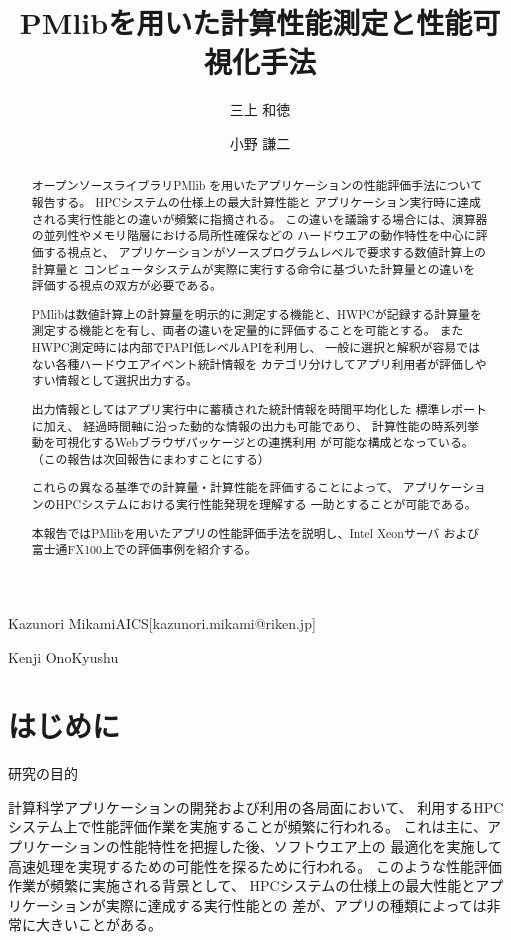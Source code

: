\documentclass[submit,techrep,noauthor]{ipsj}
\begin{document}
\title{PMlibを用いた計算性能測定と性能可視化手法}


\author{三上 和徳}{Kazunori Mikami}{AICS}[kazunori.mikami@riken.jp]
\author{小野 謙二}{Kenji Ono}{Kyushu}

\begin{abstract}
オープンソースライブラリPMlib
を用いたアプリケーションの性能評価手法について報告する。
HPCシステムの仕様上の最大計算性能と
アプリケーション実行時に達成される実行性能との違いが頻繁に指摘される。
この違いを議論する場合には、演算器の並列性やメモリ階層における局所性確保などの
ハードウエアの動作特性を中心に評価する視点と、
アプリケーションがソースプログラムレベルで要求する数値計算上の計算量と
コンピュータシステムが実際に実行する命令に基づいた計算量との違いを
評価する視点の双方が必要である。

PMlibは数値計算上の計算量を明示的に測定する機能と、HWPCが記録する計算量を
測定する機能とを有し、両者の違いを定量的に評価することを可能とする。
またHWPC測定時には内部でPAPI低レベルAPIを利用し、
一般に選択と解釈が容易ではない各種ハードウエアイベント統計情報を
カテゴリ分けしてアプリ利用者が評価しやすい情報として選択出力する。

{ \color{BLUE}
出力情報としてはアプリ実行中に蓄積された統計情報を時間平均化した
標準レポートに加え、
経過時間軸に沿った動的な情報の出力も可能であり、
計算性能の時系列挙動を可視化するWebブラウザパッケージとの連携利用
が可能な構成となっている。（この報告は次回報告にまわすことにする）
}

これらの異なる基準での計算量・計算性能を評価することによって、
アプリケーションのHPCシステムにおける実行性能発現を理解する
一助とすることが可能である。

本報告ではPMlibを用いたアプリの性能評価手法を説明し、Intel Xeonサーバ
および富士通FX100上での評価事例を紹介する。
\end{abstract}

\maketitle

\section{はじめに}
研究の目的

計算科学アプリケーションの開発および利用の各局面において、
利用するHPCシステム上で性能評価作業を実施することが頻繁に行われる。
これは主に、アプリケーションの性能特性を把握した後、ソフトウエア上の
最適化を実施して高速処理を実現するための可能性を探るために行われる。
このような性能評価作業が頻繁に実施される背景として、
HPCシステムの仕様上の最大性能とアプリケーションが実際に達成する実行性能との
差が、アプリの種類によっては非常に大きいことがある。
\end{document}
